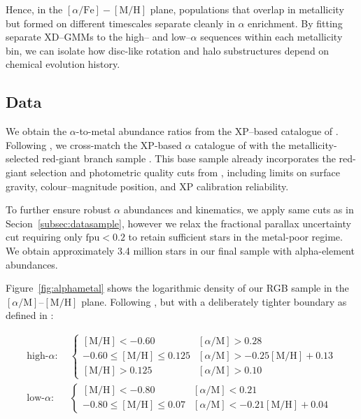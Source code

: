 \documentclass[a4paper,12pt]{article}
\begin{document}
Hence, in the $[\alpha/\mathrm{Fe}]\!-\![\mathrm{M/H}]$ plane, populations that overlap in metallicity but 
formed on different timescales separate cleanly in $\alpha$ enrichment. By fitting separate XD–GMMs to the 
high– and low–$\alpha$ sequences within each metallicity bin, we can isolate how disc-like rotation and 
halo substructures depend on chemical evolution history.




\subsection{Data}
\label{subsec:data_vis}


We obtain the $\alpha$-to-metal abundance ratios from the
XP–based catalogue of \citet{Li2024}.
Following \citet{Vis2024}, we cross-match the XP-based $\alpha$ catalogue 
of \citet{Li2024} with the metallicity-selected red-giant branch sample . This base sample already 
incorporates the red-giant selection and photometric quality cuts from 
\citet{Andrae2023}, including limits on surface gravity, colour–magnitude 
position, and XP calibration reliability. 

To further ensure robust $\alpha$ abundances and kinematics, we apply 
same cuts as in Secion~\ref{subsec:datasample}, however we relax the 
fractional parallax uncertainty cut requiring only $\mathrm{fpu}<0.2$
to retain sufficient stars in the metal-poor regime.
We obtain approximately 3.4 million stars in our final sample with alpha-element abundances.

Figure~\ref{fig:alphametal} shows the logarithmic density of our
RGB sample in the $[\alpha/\mathrm{M}]$–$[\mathrm{M/H}]$ plane.
Following \citet{Chandra_2024}, but with a deliberately tighter 
boundary as defined in \citet{Vis2024}:

\[
\begin{aligned}
\text{high-}\alpha:\;&
  \begin{cases}
    [\mathrm{M/H}] < -0.60 &
      [\alpha/\mathrm{M}] > 0.28 \\
    -0.60 \le [\mathrm{M/H}] \le 0.125 &
      [\alpha/\mathrm{M}] > -0.25[\mathrm{M/H}] + 0.13 \\
    [\mathrm{M/H}] > 0.125 &
      [\alpha/\mathrm{M}] > 0.10
  \end{cases} \\[4pt]
\text{low-}\alpha:\;&
  \begin{cases}
    [\mathrm{M/H}] < -0.80 &
      [\alpha/\mathrm{M}] < 0.21 \\
    -0.80 \le [\mathrm{M/H}] \le 0.07 &
      [\alpha/\mathrm{M}] < -0.21[\mathrm{M/H}] + 0.04
  \end{cases}
\end{aligned}
\]
\end{document}
